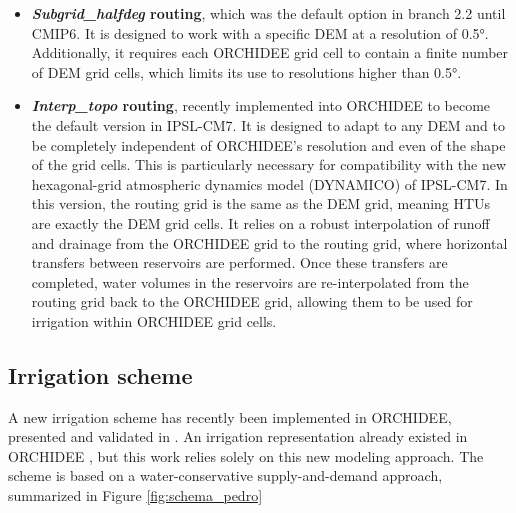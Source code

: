 \begin{itemize}
\item \textbf{\textit{Subgrid\_halfdeg} routing}, which was the default option in branch 2.2 until CMIP6. It is designed to work with a specific DEM at a resolution of 0.5°. Additionally, it requires each ORCHIDEE grid cell to contain a finite number of DEM grid cells, which limits its use to resolutions higher than 0.5°.

\item \textbf{\textit{Interp\_topo} routing}, recently implemented into ORCHIDEE to become the default version in IPSL-CM7. It is designed to adapt to any DEM and to be completely independent of ORCHIDEE’s resolution and even of the shape of the grid cells. This is particularly necessary for compatibility with the new hexagonal-grid atmospheric dynamics model (DYNAMICO) of IPSL-CM7.
In this version, the routing grid is the same as the DEM grid, meaning HTUs are exactly the DEM grid cells. It relies on a robust interpolation of runoff and drainage from the ORCHIDEE grid to the routing grid, where horizontal transfers between reservoirs are performed. Once these transfers are completed, water volumes in the reservoirs are re-interpolated from the routing grid back to the ORCHIDEE grid, allowing them to be used for irrigation within ORCHIDEE grid cells.

\end{itemize}

\subsection{Irrigation scheme}

A new irrigation scheme has recently been implemented in ORCHIDEE, presented and validated in \citet{arboleda-obando_validation_2024}. An irrigation representation already existed in ORCHIDEE \citep{de_rosnay_integrated_2003, guimberteau_global_2012}, but this work relies solely on this new modeling approach. The scheme is based on a water-conservative supply-and-demand approach, summarized in Figure \ref{fig:schema_pedro}


